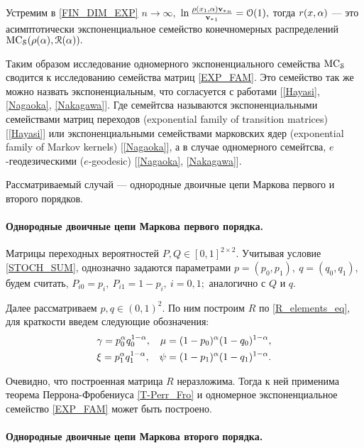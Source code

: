 Устремим в \eqref{FIN_DIM_EXP} $n \rightarrow \infty,$ $\ln \frac{\rho(x_1, \alpha){{\mathbf{v}_\ast}}_n}{{{\mathbf{v}_\ast}}_1} = \mathcal{O}(1),$ тогда $r(x, \alpha)$ --- это асимптотически экспоненциальное семейство конечномерных распределений $\mathrm{MC}_{\mathcal{S}}(\rho(\alpha), \mathcal{R}(\alpha)).$ 

Таким образом исследование одномерного экспоненциального семейства $\mathrm{MC}_{\mathcal{S}}$ сводится к исследованию семейства матриц \eqref{EXP_FAM}. Это семейство так же можно назвать экспоненциальным, что согласуется с работами [\ref{Hayasi}, \ref{Nagaoka}, \ref{Nakagawa}]. Где семейтсва называются экспоненциальными семействами матриц переходов (exponential family of transition matrices)  [\ref{Hayasi}] или экспоненциальными семействами марковских ядер (exponential family of Markov kernels) [\ref{Nagaoka}], а в случае одномерного семейтсва, $\!e\!$-геодезическими ($\!e \!$-geodesic)  [\ref{Nagaoka}, \ref{Nakagawa}]. 

Рассматриваемый случай --- однородные двоичные цепи Маркова первого и второго порядков. 

\paragraph{Однородные двоичные цепи Маркова первого порядка.}

Матрицы переходных вероятностей $P, Q \in [0, 1]^{2 \times 2}.$ Учитывая условие \eqref{STOCH_SUM}, однозначно задаются параметрами $p = (p_0, p_1),\  q = (q_0, q_1),$ будем считать, $P_{i0} = p_i, \ P_{i1} = 1 - p_i, \ i = 0, 1;$ аналогично с $Q$ и $q.$

Далее рассматриваем $p, q \in (0, 1)^{2}.$ По ним построим $R$ по \eqref{R_elements_eq}, для краткости введем следующие обозначения:
\begin{align}
\label{R_1}
& \gamma = p_0^\alpha q_0^{1 - \alpha}, & \mu = (1 - p_0)^\alpha (1 - q_0)^{1 - \alpha}, \nonumber \\
& \xi = p_1^\alpha q_1^{1 - \alpha}, & \psi = (1 - p_1)^\alpha (1 - q_1)^{1 - \alpha}. 
\end{align}

Очевидно, что построенная матрица $R$ неразложима. Тогда к ней применима теорема Перрона-Фробениуса \ref{T-Perr_Fro} и одномерное экспоненциальное семейство \eqref{EXP_FAM} может быть построено.

\paragraph{Однородные двоичные цепи Маркова второго порядка.} 

